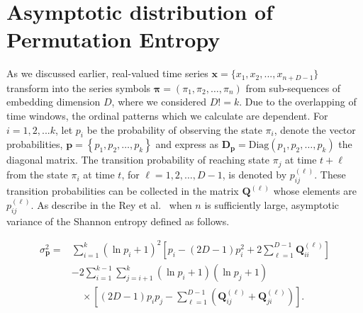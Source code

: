 \section{Asymptotic distribution of Permutation Entropy}\label{Sec:AsymptoticVariance}

As we discussed earlier, real-valued time series $\mathbf{x}=\{x_1,x_2,...,x_{n+D-1}\}$  transform into the series symbols $\mathbf{{\pi}}=({\pi}_1, {\pi}_2,\dots, {\pi}_n)$ from sub-sequences of embedding dimension $D$, where we considered $D!=k$. Due to the overlapping of time windows, the ordinal patterns which we calculate are dependent. For $i=1,2,...k$, let $p_i$ be the probability of observing the state $\pi_i$, denote the vector probabilities, $\mathbf{p}={\left\{p_1,p_2,\dots,p_k\right\}}$ and express as $\mathbf{D_p}=\text{Diag}(p_1,p_2, \dots, p_k)$ the diagonal matrix. 
The transition probability of reaching state $\pi_j$ at time 
$t+\ell$ from the state $\pi_i$ at time $t$, for $\ell=1,2,\dots,D-1$, is denoted by $p^{(\ell)}_{ij}$. These transition probabilities can be collected in the matrix $\mathbf{Q}^{(\ell)}$ whose elements are  $p^{(\ell)}_{ij}$. As describe in the Rey et al.~\cite{Rey2023a} when $n$ is sufficiently large, asymptotic variance of the Shannon entropy defined as follows. 

\begin{equation}
	\begin{split}
		\sigma^2_{\mathbf{p}} = & \sum_{i=1}^{k}(\ln p_i + 1)^2 
		\left[ p_i - (2D - 1)p_i^2 + 2\sum_{\ell=1}^{D-1} \mathbf{Q}^{(\ell)}_{ii} \right] \\
		& - 2 \sum_{i=1}^{k-1} \sum_{j=i+1}^{k} (\ln p_i + 1)(\ln p_j + 1) \\
		& \quad \times \left[ (2D - 1)p_i p_j - \sum_{\ell=1}^{D-1} \left( \mathbf{Q}^{(\ell)}_{ij} + \mathbf{Q}^{(\ell)}_{ji} \right) \right].
	\end{split}
	\label{eq:asympvar}
\end{equation} 

